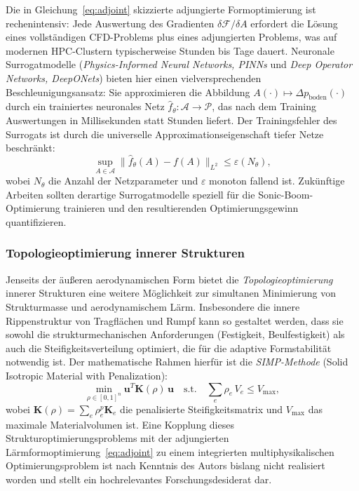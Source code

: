 ﻿\documentclass[12pt,a4paper]{article}
\theoremstyle{definition}
\theoremstyle{remark}
\begin{document}
Die in Gleichung~\eqref{eq:adjoint} skizzierte adjungierte Formoptimierung ist rechenintensiv:
Jede Auswertung des Gradienten $\delta\mathcal{F}/\delta A$ erfordert die Lösung eines
vollständigen CFD-Problems plus eines adjungierten Problems, was auf modernen HPC-Clustern
typischerweise Stunden bis Tage dauert. Neuronale Surrogatmodelle (\emph{Physics-Informed
Neural Networks, PINNs} und \emph{Deep Operator Networks, DeepONets}) bieten hier einen
vielversprechenden Beschleunigungsansatz: Sie approximieren die Abbildung
$A(\cdot) \mapsto \Delta p_\text{boden}(\cdot)$ durch ein trainiertes neuronales Netz
$\hat{f}_\theta: \mathcal{A} \to \mathcal{P}$, das nach dem Training Auswertungen in
Millisekunden statt Stunden liefert. Der Trainingsfehler des Surrogats ist durch die
universelle Approximationseigenschaft tiefer Netze beschränkt:
\begin{equation}
  \sup_{A \in \mathcal{A}} \|\hat{f}_\theta(A) - f(A)\|_{L^2} \le \varepsilon(N_\theta),
  \label{eq:surrogat}
\end{equation}
wobei $N_\theta$ die Anzahl der Netzparameter und $\varepsilon$ monoton fallend ist.
Zukünftige Arbeiten sollten derartige Surrogatmodelle speziell für die Sonic-Boom-Optimierung
trainieren und den resultierenden Optimierungsgewinn quantifizieren.

\subsubsection{Topologieoptimierung innerer Strukturen}

Jenseits der äußeren aerodynamischen Form bietet die \emph{Topologieoptimierung} innerer
Strukturen eine weitere Möglichkeit zur simultanen Minimierung von Strukturmasse und
aerodynamischem Lärm. Insbesondere die innere Rippenstruktur von Tragflächen und Rumpf
kann so gestaltet werden, dass sie sowohl die strukturmechanischen Anforderungen (Festigkeit,
Beulfestigkeit) als auch die Steifigkeitsverteilung optimiert, die für die adaptive
Formstabilität notwendig ist. Der mathematische Rahmen hierfür ist die
\emph{SIMP-Methode} (Solid Isotropic Material with Penalization):
\begin{equation}
  \min_{\rho \in [0,1]^n} \mathbf{u}^T \mathbf{K}(\rho)\, \mathbf{u}
  \quad \text{s.t.} \quad \sum_e \rho_e \, V_e \le V_{\max},
  \label{eq:simp}
\end{equation}
wobei $\mathbf{K}(\rho) = \sum_e \rho_e^p \mathbf{K}_e$ die penalisierte Steifigkeitsmatrix
und $V_{\max}$ das maximale Materialvolumen ist. Eine Kopplung dieses Strukturoptimierungsproblems
mit der adjungierten Lärmformoptimierung~\eqref{eq:adjoint} zu einem integrierten multiphysikalischen
Optimierungsproblem ist nach Kenntnis des Autors bislang nicht realisiert worden und stellt
ein hochrelevantes Forschungsdesiderat dar.
\end{document}
